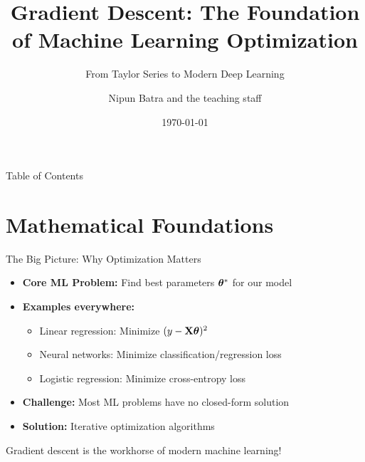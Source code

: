 \documentclass[usenames,dvipsnames]{beamer}
\title{Gradient Descent: The Foundation of Machine Learning Optimization}
\subtitle{From Taylor Series to Modern Deep Learning}
\date{\today}
\author{Nipun Batra and the teaching staff}
\institute{IIT Gandhinagar}
\begin{document}
  \maketitle

  \begin{frame}{Table of Contents}
    \tableofcontents
  \end{frame}

  \section{Mathematical Foundations}
  
  \begin{frame}{The Big Picture: Why Optimization Matters}
    \begin{itemize}[<+->]
        \item \textbf{Core ML Problem:} Find best parameters $\boldsymbol{\theta}^*$ for our model
        \item \textbf{Examples everywhere:}
        \begin{itemize}
            \item Linear regression: Minimize $(y - \mathbf{X}\boldsymbol{\theta})^2$
            \item Neural networks: Minimize classification/regression loss
            \item Logistic regression: Minimize cross-entropy loss
        \end{itemize}
        \item \textbf{Challenge:} Most ML problems have no closed-form solution
        \item \textbf{Solution:} Iterative optimization algorithms
    \end{itemize}
    
    \pause
    \begin{keypointsbox}
    Gradient descent is the workhorse of modern machine learning!
    \end{keypointsbox}
  \end{frame}
\end{document}
